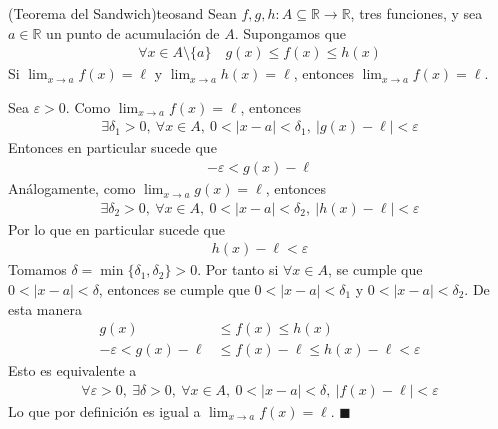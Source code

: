 \documentclass[12pt]{book}
\renewenvironment{proof}[1][\textit{Demostración}]{%
  \par\noindent{\bfseries #1.}\enspace}{\hfill$\blacksquare$\par}
\begin{document}
\begin{teo}{(Teorema del Sandwich)}{teosand}
    Sean $f,g,h: A \subseteq\mathbb{R} \to \mathbb{R}$, tres funciones, y sea $a \in \mathbb{R}$ un punto de acumulación de $A$. Supongamos que 
    \begin{align*}
        \forall x \in A\setminus \{a\} \quad g(x)\leq f(x) \leq h(x)
    \end{align*}
    Si $\displaystyle \lim_{x\to a}f(x)=\ell$ y $\displaystyle \lim_{x\to a }h(x)=\ell$, entonces $\displaystyle \lim_{x\to a}f(x)=\ell$.
\end{teo}
\begin{proof}
    Sea $\varepsilon>0$. Como $\displaystyle \lim_{x \to a}f(x)=\ell$, entonces
    \begin{align*}
        \exists\delta_1>0, \ \forall x \in A, \ 0<|x-a|<\delta_1, \ |g(x)-\ell|<\varepsilon
    \end{align*}
    Entonces en particular sucede que
    \begin{align*}
        -\varepsilon<g(x)-\ell
    \end{align*}
    Análogamente, como $\displaystyle \lim_{x \to a}g(x)=\ell$, entonces
    \begin{align*}
         \exists\delta_2>0, \ \forall x \in A, \ 0<|x-a|<\delta_2, \ |h(x)-\ell|<\varepsilon
    \end{align*}
    Por lo que en particular sucede que
    \begin{align*}
        h(x)-\ell < \varepsilon
    \end{align*}
    Tomamos $\delta=\min\{\delta_1,\delta_2\}>0$. Por tanto si $\forall x \in A$, se cumple que $0<|x-a|<\delta$, entonces se cumple que $0<|x-a|<\delta_1$ y $0<|x-a|<\delta_2$. De esta manera
    \begin{align*}
        g(x)&\leq f(x)\leq h(x) \\
       -\varepsilon<g(x)-\ell &\leq f(x)- \ell \leq h(x)-\ell < \varepsilon 
    \end{align*}
    Esto es equivalente a 
    \begin{align*}
        \forall \varepsilon>0, \ \exists \delta>0, \ \forall x \in A, \ 0<|x-a|<\delta, \ |f(x)-\ell| < \varepsilon
    \end{align*}
    Lo que por definición es igual a $\displaystyle \lim_{x\to a} f(x)=\ell$. 
\end{proof}
\end{document}
